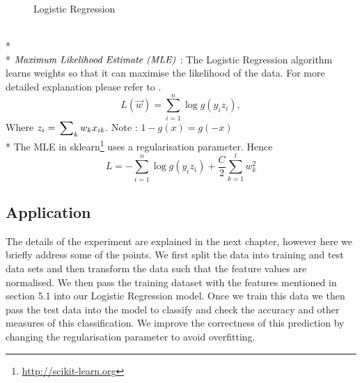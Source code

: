 \begin{figure}[!h]
 \centering
  \caption[Logistic Regression]
  {Logistic Regression}
\end{figure}\\*\\*
\newpage
\noindent
$\emph{Maximum Likelihood Estimate (MLE)}$ : The Logistic Regression algorithm learns weights so that it can maximise the likelihood of the data. For more detailed explanation please refer to \cite{15}. 
$$L(\vec w) = \sum_{i=1}^{n}\log g(y_iz_i),$$ 
Where $z_i = \sideset{}{_k}\sum w_kx_{ik}$. Note : $1 - g(x) = g(-x)$\\*
The MLE in sklearn\footnote{\url{http://scikit-learn.org}} uses a regularisation parameter. Hence 
$$L = - \sum_{i=1}^{n}\log g(y_iz_i) + \frac{C}{2}\sum_{k=1}^{l} w_k^2$$

\subsection{Application}
The details of the experiment are explained in the next chapter, however here we briefly address some of the points. We first split the data into training and test data sets and then transform the data such that the feature values are normalised. We then pass the training dataset with the features mentioned in section 5.1 into our Logistic Regression model. Once we train this data we then pass the test data into the model to classify and check the accuracy and other measures of this classification. We improve the correctness of this prediction by changing the regularisation parameter to avoid overfitting. 


